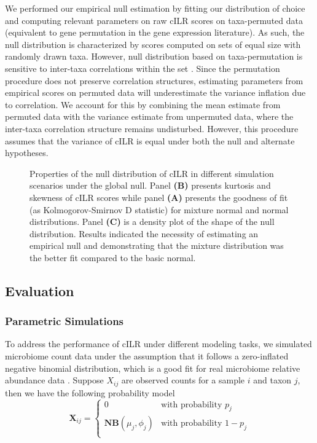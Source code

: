 \documentclass[10pt,letterpaper]{article}
\begin{document}
We performed our empirical null estimation by fitting our distribution of choice and computing relevant parameters on raw cILR scores on taxa-permuted data (equivalent to gene permutation in the gene expression literature). As such, the null distribution is characterized by scores computed on sets of equal size with randomly drawn taxa. However, null distribution based on taxa-permutation is sensitive to inter-taxa correlations within the set \cite{wu2012}. Since the permutation procedure does not preserve correlation structures, estimating parameters from empirical scores on permuted data will underestimate the variance inflation due to correlation. We account for this by combining the mean estimate from permuted data with the variance estimate from unpermuted data, where the inter-taxa correlation structure remains undisturbed. However, this procedure assumes that the variance of cILR is equal under both the null and alternate hypotheses. 

\begin{figure}
    \centering
    \caption{Properties of the null distribution of cILR in different simulation scenarios under the global null. Panel \textbf{(B)} presents kurtosis and skewness of cILR scores while panel \textbf{(A)} presents the goodness of fit (as Kolmogorov-Smirnov D statistic) for mixture normal and normal distributions. Panel \textbf{(C)} is a density plot of the shape of the null distribution. Results indicated the necessity of estimating an empirical null and demonstrating that the mixture distribution was the better fit compared to the basic normal.}
    \label{fig:kurt_gof}
\end{figure}

\subsection*{Evaluation}
\subsubsection*{Parametric Simulations}  
To address the performance of cILR under different modeling tasks, we simulated microbiome count data under the assumption that it follows a zero-inflated negative binomial distribution, which is a good fit for real microbiome relative abundance data \cite{calgaro2020}. Suppose $X_{ij}$ are observed counts for a sample $i$ and taxon $j$, then we have the following probability model
\begin{equation}
    \mathbf{X}_{ij} =
      \begin{cases}
        0 & \text{with probability $p_j$}\\
        \mathbf{NB}(\mu_j, \phi_j) & \text{with probability $1 - p_j$}\\
      \end{cases}       
\end{equation}
\end{document}
